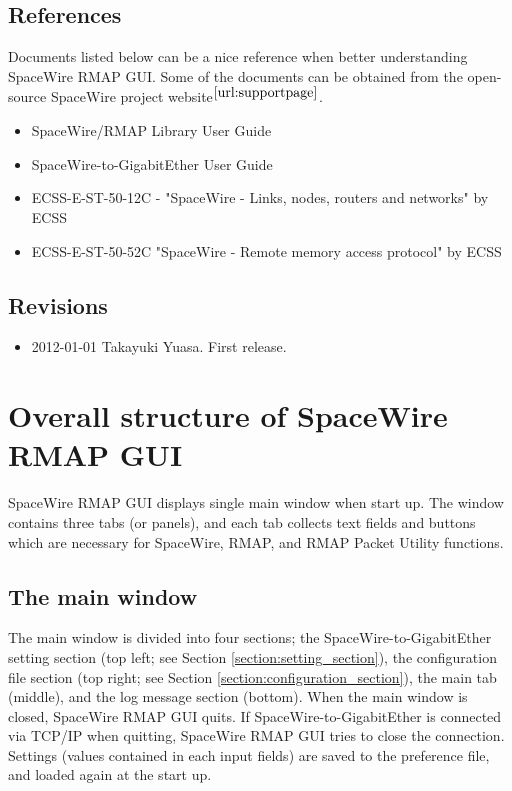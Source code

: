 \documentclass[a4paper,10pt]{article}
\begin{document}
\subsection{References}
Documents listed below can be a nice reference when better understanding SpaceWire RMAP GUI. Some of the documents can be obtained from the open-source SpaceWire project website$^\mathrm{\ref{url:supportpage}}$.
\begin{itemize}
  \setlength{\parskip}{0cm}
  \setlength{\itemsep}{0cm}
\item SpaceWire/RMAP Library User Guide
\item SpaceWire-to-GigabitEther User Guide
\item ECSS-E-ST-50-12C - "SpaceWire - Links, nodes, routers and networks" by ECSS
\item ECSS-E-ST-50-52C "SpaceWire - Remote memory access protocol" by ECSS
\end{itemize}

\subsection{Revisions}
\begin{itemize}
  \setlength{\parskip}{0cm}
  \setlength{\itemsep}{0cm}
\item 2012-01-01 Takayuki Yuasa. First release.
\end{itemize}



\section{Overall structure of SpaceWire RMAP GUI}
SpaceWire RMAP GUI displays single main window when start up.
The window contains three tabs (or panels), and each tab collects text fields and buttons which are necessary for SpaceWire, RMAP, and RMAP Packet Utility functions.

\subsection{The main window}
The main window is divided into four sections; the SpaceWire-to-GigabitEther setting section (top left; see Section \ref{section:setting_section}), the configuration file section (top right; see Section \ref{section:configuration_section}), the main tab (middle), and the log message section (bottom). When the main window is closed, SpaceWire RMAP GUI quits. If SpaceWire-to-GigabitEther is connected via TCP/IP when quitting, SpaceWire RMAP GUI tries to close the connection. Settings (values contained in each input fields) are saved to the preference file, and loaded again at the start up.
\end{document}
